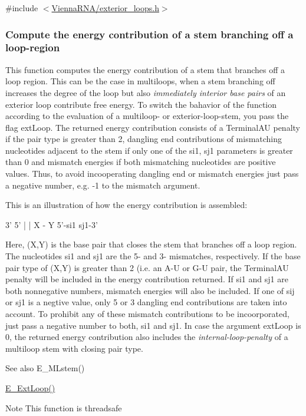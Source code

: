 {\ttfamily \#include $<$\hyperlink{exterior__loops_8h}{Vienna\+R\+N\+A/exterior\+\_\+loops.\+h}$>$}

\subsubsection*{Compute the energy contribution of a stem branching off a loop-\/region}

This function computes the energy contribution of a stem that branches off a loop region. This can be the case in multiloops, when a stem branching off increases the degree of the loop but also {\itshape immediately interior base pairs} of an exterior loop contribute free energy. To switch the bahavior of the function according to the evaluation of a multiloop-\/ or exterior-\/loop-\/stem, you pass the flag \textquotesingle{}ext\+Loop\textquotesingle{}. The returned energy contribution consists of a Terminal\+A\+U penalty if the pair type is greater than 2, dangling end contributions of mismatching nucleotides adjacent to the stem if only one of the si1, sj1 parameters is greater than 0 and mismatch energies if both mismatching nucleotides are positive values. Thus, to avoid incooperating dangling end or mismatch energies just pass a negative number, e.\+g. -\/1 to the mismatch argument.

This is an illustration of how the energy contribution is assembled\+: 
\begin{DoxyPre}
      3'  5'
      |   |
      X - Y
5'-si1     sj1-3'
\end{DoxyPre}


Here, (X,Y) is the base pair that closes the stem that branches off a loop region. The nucleotides si1 and sj1 are the 5\textquotesingle{}-\/ and 3\textquotesingle{}-\/ mismatches, respectively. If the base pair type of (X,Y) is greater than 2 (i.\+e. an A-\/\+U or G-\/\+U pair, the Terminal\+A\+U penalty will be included in the energy contribution returned. If si1 and sj1 are both nonnegative numbers, mismatch energies will also be included. If one of sij or sj1 is a negtive value, only 5\textquotesingle{} or 3\textquotesingle{} dangling end contributions are taken into account. To prohibit any of these mismatch contributions to be incoorporated, just pass a negative number to both, si1 and sj1. In case the argument ext\+Loop is 0, the returned energy contribution also includes the {\itshape internal-\/loop-\/penalty} of a multiloop stem with closing pair type.

\begin{DoxySeeAlso}{See also}
E\+\_\+\+M\+Lstem() 

\hyperlink{group__loops_ga05c6288c5a79d3bd5ad6d33c1bb34bd0}{E\+\_\+\+Ext\+Loop()} 
\end{DoxySeeAlso}
\begin{DoxyNote}{Note}
This function is threadsafe
\end{DoxyNote}


